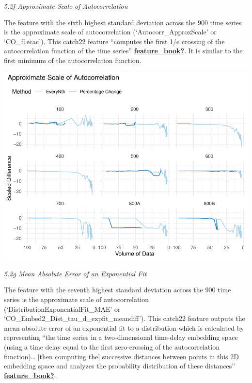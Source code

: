 \documentclass{article}
\begin{document}
\emph{5.2f Approximate Scale of Autocorrelation}

The feature with the sixth highest standard deviation across the 900
time series is the approximate scale of autocorrelation
(`Autocorr\_ApproxScale' or `CO\_f1ecac'). This catch22 feature
``computes the first 1/e crossing of the autocorrelation function of the
time series''
\protect\hyperlink{ref-feature_book}{\textbf{feature\_book?}}. It is
similar to the first minimum of the autocorrelation function.

\includegraphics{210431461_CSC8639_Dissertation_files/figure-latex/ApproxScale-1.pdf}

\emph{5.2g Mean Absolute Error of an Exponential Fit}

The feature with the seventh highest standard deviation across the 900
time series is the approximate scale of autocorrelation
(`DistributionExponentialFit\_MAE' or
`CO\_Embed2\_Dist\_tau\_d\_expfit\_meandiff'). This catch22 feature
outputs the mean absolute error of an exponential fit to a distribution
which is calculated by representing ``the time series in a
two-dimensional time-delay embedding space (using a time delay equal to
the first zero-crossing of the autocorrelation function)\ldots{} {[}then
computing the{]} successive distances between points in this 2D
embedding space and analyzes the probability distribution of these
distances''
\protect\hyperlink{ref-feature_book}{\textbf{feature\_book?}}.
\end{document}
